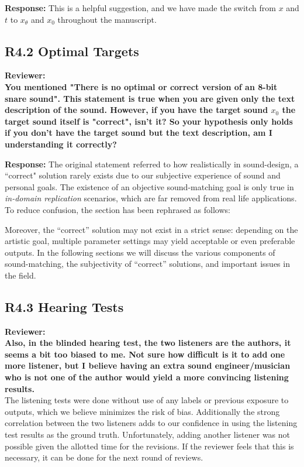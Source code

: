 \documentclass[11pt]{article}
\begin{document}
\noindent\textbf{Response:}
This is a helpful suggestion, and we have made the switch from $x$ and $t$ to $x_{\theta}$ and $x_0$ throughout the manuscript. 

\subsection{\textbf{R4.2} Optimal Targets}
\noindent\textbf{Reviewer:}\\
\textbf{You mentioned "There is no optimal or correct version of an 8-bit snare sound".
This statement is true when you are given only the text description of the sound. However, if you have the target sound $x_0$  the target sound itself is "correct", isn't it? So your hypothesis only holds if you don't have the target sound but the text description, am I understanding it correctly?\\}

\noindent\textbf{Response:}
The original statement referred to how realistically in sound-design, a ``correct" solution rarely exists due to our subjective experience of sound and personal goals. The existence of an objective sound-matching goal is only true in \textit{in-domain replication} scenarios, which are far removed from real life applications. To reduce confusion, the section has been rephrased as follows:
\begin{displayquote}
    Moreover, the ``correct'' solution may not exist in a strict sense: depending on the artistic goal, multiple parameter settings may yield acceptable or even preferable outputs.  In the following sections we will discuss the various components of sound-matching, the subjectivity of ``correct'' solutions, and important issues in the field.
\end{displayquote}

\subsection{R4.3 Hearing Tests}
\label{}
\noindent\textbf{Reviewer:}\\
\textbf{Also, in the blinded hearing test, the two listeners are the authors, it seems a bit too biased to me. Not sure how difficult is it to add one more listener, but I believe having an extra sound engineer/musician who is not one of the author would yield a more convincing listening results.
}
\\

The listening tests were done without use of any labels or previous exposure to outputs, which we believe minimizes the risk of bias. Additionally the strong correlation between the two listeners adds to our confidence in using the listening test results as the ground truth. Unfortunately, adding another listener was not possible given the allotted time for the revisions. If the reviewer feels that this is necessary, it can be done for the next round of reviews. 
\end{document}
